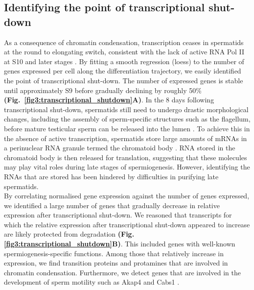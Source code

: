\subsection{Identifying the point of transcriptional shut-down}

As a consequence of chromatin condensation, transcription ceases in spermatids at the round to elongating switch, consistent with the lack of active RNA Pol II at S10 and later stages \citep{DottermuschHeidel2014}.
By fitting a smooth regression (loess) to the number of genes expressed per cell along the differentiation trajectory, we easily identified the point of transcriptional shut-down. 
The number of expressed genes is stable until approximately S9 before gradually declining by roughly 50\% \textbf{(Fig.~\ref{fig3:transcriptional_shutdown}A)}. 
In the 8 days following transcriptional shut-down, spermatids still need to undergo drastic morphological changes, including the assembly of sperm-specific structures such as the flagellum, before mature testicular sperm can be released into the lumen \citep{ODonnell2014}. 
To achieve this in the absence of active transcription, spermatids store large amounts of mRNAs in a perinuclear RNA granule termed the chromatoid body \citep{Kotaja2007}. RNA stored in the chromatoid body is then released for translation, suggesting that these molecules may play vital roles during late stages of spermiogenesis. 
However, identifying the RNAs that are stored has been hindered by difficulties in purifying late spermatids. \\

By correlating normalised gene expression against the number of genes expressed, we identified a large number of genes that gradually decrease in relative expression after transcriptional shut-down. 
We reasoned that transcripts for which the relative expression after transcriptional shut-down appeared to increase are likely protected from degradation \textbf{(Fig. \ref{fig3:transcriptional_shutdown}B)}. 
This included genes with well-known spermiogenesis-specific functions. Among those that relatively increase in expression, we find transition proteins and protamines that are involved in chromatin condensation. 
Furthermore, we detect genes that are involved in the development of sperm motility such as \gls{Akap4} and \gls{Cabs1} \citep{Kawashima2009, Miki2002}. 

\newpage

